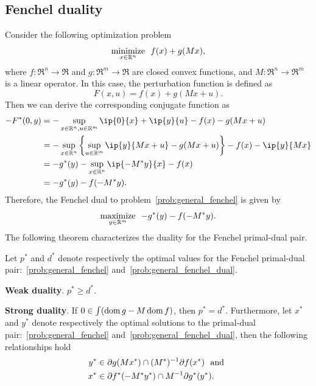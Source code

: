 \subsection{Fenchel duality}
Consider the following optimization problem 
\begin{equation} \label{prob:general_fenchel} 
    \displaystyle\mathop{\hbox{\rm minimize}}_{x \in \mathbb{R}^n}\enspace f(x) + g(Mx),
\end{equation}
where $f:\Re^n\to\Re$ and $g:\Re^m\to\Re$ are closed convex functions, and $M:\Re^n\to\Re^m$ is a linear operator. In this case, the perturbation function is defined as 
\begin{equation}
    F(x, u) = f(x) + g(Mx + u).
\end{equation}
Then we can derive the corresponding conjugate function as
\begin{align*}
    -F^*(0, y) &= -\sup_{x\in\Re^n, u\in\Re^m} \ip{0}{x} + \ip{y}{u} - f(x) - g(Mx + u)
             \\&= -\sup_{x\in\Re^n} \left\{\sup_{u\in\Re^m} \ip{y}{Mx + u} - g(Mx + u)\right\} - f(x) - \ip{y}{Mx}
             \\&= - g^*(y) - \sup_{x\in\Re^n}\ip{-M^*y}{x} - f(x) 
             \\&= - g^*(y) - f(-M^*y).
\end{align*}
Therefore, the Fenchel dual to problem~\eqref{prob:general_fenchel} is given by
\begin{equation} \label{prob:general_fenchel_dual}
    \displaystyle\mathop{\hbox{\rm maximize}}_{y\in\mathbb{R}^m}\enspace - g^*(y) - f(-M^*y).
\end{equation}
The following theorem characterizes the duality for the Fenchel primal-dual pair. 

\begin{theorem} 
    Let $p^*$ and $d^*$ denote respectively the optimal values for the Fenchel primal-dual pair:~\eqref{prob:general_fenchel} and~\eqref{prob:general_fenchel_dual}. 
    \item \textbf{Weak duality}. $p^* \geq d^*$. 
    \item \textbf{Strong duality}. 
    If $0\in\int(\operatorname{dom} g - M\operatorname{dom} f)$, then $p^* = d^*$. Furthermore, let $x^*$ and $y^*$ denote respectively the optimal solutions to the primal-dual pair:~\eqref{prob:general_fenchel} and~\eqref{prob:general_fenchel_dual}, then the following relationships hold
    \begin{align*}
          y^* &\in \partial g(Mx^*) \cap (M^*)^{-1}\partial f(x^*) \enspace\mathop{\hbox{\rm and}}\enspace
        \\x^* &\in \partial f^*(-M^*y^*)\cap M^{-1}\partial g^*(y^*).
    \end{align*}
\end{theorem}




